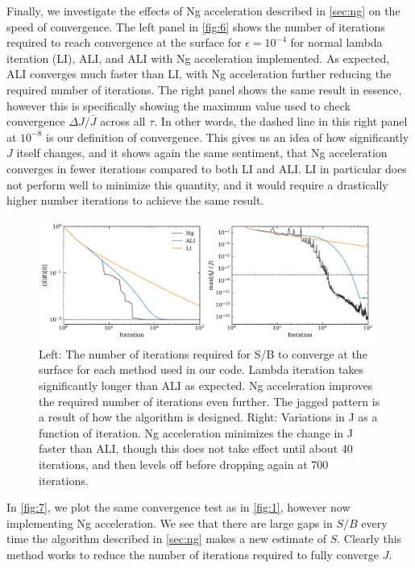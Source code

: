 \documentclass[12pt]{article}
\begin{document}
Finally, we investigate the effects of Ng acceleration described in \autoref{sec:ng} on the speed of convergence. The left panel in \autoref{fig:6} shows the number of iterations required to reach convergence at the surface for $\epsilon = 10^{-4}$ for normal lambda iteration (LI), ALI, and ALI with Ng acceleration implemented. As expected, ALI converges much faster than LI, with Ng acceleration further reducing the required number of iterations. The right panel shows the same result in essence, however this is specifically showing the maximum value used to check convergence $\Delta J / \bar{J}$ across all $\tau$. In other words, the dashed line in this right panel at $10^{-8}$ is our definition of convergence. This gives us an idea of how significantly $J$ itself changes, and it shows again the same sentiment, that Ng acceleration converges in fewer iterations compared to both LI and ALI. LI in particular does not perform well to minimize this quantity, and it would require a drastically higher number iterations to achieve the same result.

\begin{figure}[ht]
 \centering
 \includegraphics[width=0.99\textwidth]{iterations.pdf}
 \caption{Left: The number of iterations required for S/B to converge at the surface for each method used in our code. Lambda iteration takes significantly longer than ALI as expected. Ng acceleration improves the required number of iterations even further. The jagged pattern is a result of how the algorithm is designed. Right: Variations in J as a function of iteration. Ng acceleration minimizes the change in J faster than ALI, though this does not take effect until about 40 iterations, and then levels off before dropping again at 700 iterations.}
  \label{fig:6}
\end{figure}

In \autoref{fig:7}, we plot the same convergence test as in \autoref{fig:1}, however now implementing Ng acceleration. We see that there are large gaps in $S / B$ every time the algorithm described in \autoref{sec:ng} makes a new estimate of $S$. Clearly this method works to reduce the number of iterations required to fully converge $J$.
\end{document}
